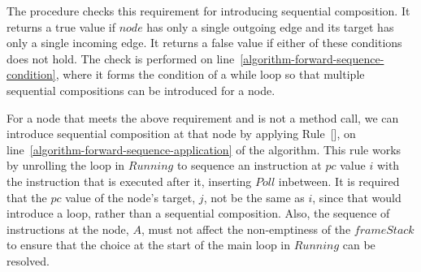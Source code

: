 The procedure  checks this requirement
for introducing sequential composition.
It returns a true value if $node$ has only a single outgoing edge and
its target has only a single incoming edge.
It returns a false value if either of these conditions does not hold.
The check is performed on
line~\ref{algorithm-forward-sequence-condition}, where it forms the
condition of a while loop so that multiple sequential compositions can
be introduced for a node.

For a node that meets the above requirement and is not a method call,
we can introduce sequential composition at that node by applying
Rule~[], on
line~\ref{algorithm-forward-sequence-application} of the algorithm.
This rule works by unrolling the loop in $Running$ to sequence an
instruction at $pc$ value $i$ with the instruction that is executed
after it, inserting $Poll$ inbetween.
It is required that the $pc$ value of the node's target, $j$, not be
the same as $i$, since that would introduce a loop, rather than a
sequential composition.
Also, the sequence of instructions at the node, $A$, must not affect
the non-emptiness of the $frameStack$ to ensure that the choice at the
start of the main loop in $Running$ can be resolved.
